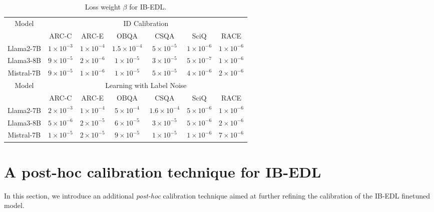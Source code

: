 \begin{table}[t]
    \centering
    \caption{Loss weight $\beta$ for IB-EDL.}
    \label{tab:beta_values}
    \begin{tabular}{c | c c c c c c}
        \toprule
        \multirow{2}{*}{Model} & \multicolumn{6}{c}{ID Calibration} \\
        \cmidrule{2-7}
         & ARC-C & ARC-E & OBQA & CSQA & SciQ & RACE \\
        \midrule
        Llama2-7B & $1\times10^{-3}$ & $1\times10^{-4}$ & $1.5 \times 10^{-4}$ & $5 \times 10^{-5}$ & $1\times10^{-6}$ & $1\times10^{-6}$ \\ 
        Llama3-8B & $9\times 10^{-5}$ & $2\times 10^{-6}$ & $1 \times 10^{-5}$ & $3 \times 10^{-5}$ & $5\times 10^{-7}$ & $1\times10^{-6}$ \\
        Mistral-7B & $9\times10^{-5}$ & $1\times10^{-6}$ & $1\times10^{-5}$ & $5\times 10^{-5}$ & $4\times10^{-6}$ & $2\times10^{-6}$ \\
        \midrule
        \multirow{2}{*}{Model} & \multicolumn{6}{c}{Learning with Label Noise} \\
        \cmidrule{2-7}
         & ARC-C & ARC-E & OBQA & CSQA & SciQ & RACE \\
        \midrule
        Llama2-7B & $2\times 10^{-3}$ & $1\times10^{-4}$ & $5\times10^{-4}$ & $1.6\times10^{-4}$ & $5\times10^{-6}$ & $1\times10^{-6}$ \\
        Llama3-8B & $5\times10^{-6}$ & $2\times10^{-5}$ & $6\times10^{-5}$ & $3\times10^{-5}$ & $5\times10^{-6}$ & $2\times10^{-6}$ \\
        Mistral-7B & $1\times10^{-5}$ & $2\times10^{-5}$ & $9\times10^{-5}$ & $1\times10^{-5}$ & $1\times10^{-6}$ & $7\times10^{-6}$ \\
        \bottomrule
    \end{tabular}
\end{table}

\section{A post-hoc calibration technique for IB-EDL}
In this section, we introduce an additional \emph{post-hoc} calibration technique aimed at further refining the calibration of the IB-EDL finetuned model.

